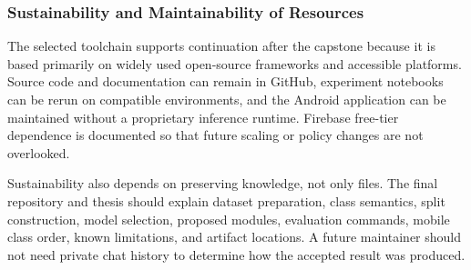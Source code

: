 \subsubsection{Sustainability and Maintainability of Resources}
The selected toolchain supports continuation after the capstone because it is based primarily on widely used open-source frameworks and accessible platforms. Source code and documentation can remain in GitHub, experiment notebooks can be rerun on compatible environments, and the Android application can be maintained without a proprietary inference runtime. Firebase free-tier dependence is documented so that future scaling or policy changes are not overlooked.\par
Sustainability also depends on preserving knowledge, not only files. The final repository and thesis should explain dataset preparation, class semantics, split construction, model selection, proposed modules, evaluation commands, mobile class order, known limitations, and artifact locations. A future maintainer should not need private chat history to determine how the accepted result was produced.\par
